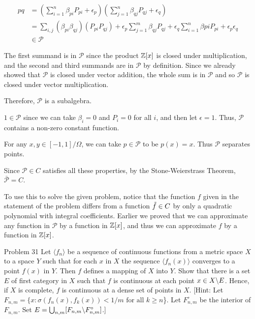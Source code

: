 \documentclass{hmwk}
\begin{document}
\begin{solution}
\begin{align*}
    pq &= \left(\sum_{i = 1}^n \beta_{pi}P_{pi} + \epsilon_p\right)\left(\sum_{j = 1}^n \beta_{qj}P_{qj} + \epsilon_q\right) \\
    &= \sum_{i, j}(\beta_{pi}\beta_{qj})(P_{pi}P_{qj}) + \epsilon_p\sum_{j = 1}^m \beta_{qj}P_{qj} + \epsilon_q\sum_{i = 1}^n\beta{pi}P_{pi} + \epsilon_p\epsilon_q \\
    &\in \mathcal{P}
\end{align*}

\pre The first summand is in $\mathcal{P}$ since the product $\mathbb{Z}[x]$ is closed under multiplication, and the second and third summands are in $\mathcal{P}$ by definition. Since we already showed that $\mathcal{P}$ is closed under vector addition, the whole sum is in $\mathcal{P}$ and so $\mathcal{P}$ is closed under vector multiplication. 

\pre Therefore, $\mathcal{P}$ is a subalgebra. 

\pre $1 \in \mathcal{P}$ since we can take $\beta_i = 0$ and $P_{i} = 0$ for all $i$, and then let $\epsilon = 1$. Thus, $\mathcal{P}$ contains a non-zero constant function. 

\pre For any $x, y \in [-1, 1]/\Omega$, we can take $p \in \mathcal{P}$ to be $p(x) = x$. Thus $\mathcal{P}$ separates points. 

\pre Since $\mathcal{P} \in C$ satisfies all these properties, by the Stone-Weierstrass Theorem, $\bar{\mathcal{P}} = C$. 

\pre To use this to solve the given problem, notice that the function $f$ given in the statement of the problem differs from a function $\Tilde{f} \in C$ by only a quadratic polynomial with integral coefficients. Earlier we proved that we can approximate any function in $\mathcal{P}$ by a function in $\mathbb{Z}[x]$, and thus we can approximate $f$ by a function in $\mathbb{Z}[x]$.
\end{solution}

\begin{problem}{Problem 31}
Let $\langle f_n \rangle $ be a sequence of continuous functions from a metric space $X$ to a space $Y$ such that for each $x$ in $X$ the sequence $\langle f_n(x) \rangle$ converges to a point $f(x)$ in $Y$. Then $f$ defines a mapping of $X$ into $Y$. Show that there is a set $E$ of first category in $X$ such that $f$ is continuous at each point $x \in X\backslash E$. Hence, if $X$ is complete, $f$ is continuous at a dense set of points in $X$. [Hint: Let $F_{n, m} = \{x : \sigma(f_n(x), f_k(x)) < 1/m \text{ for all } k \geq n$\}. Let $F_{n,m}^\circ$ be the interior of $F_{n, m}$. Set $E = \bigcup_{n, m} [F_{n, m}\backslash F_{n, m}^\circ]$.]
\end{problem}
\end{document}
